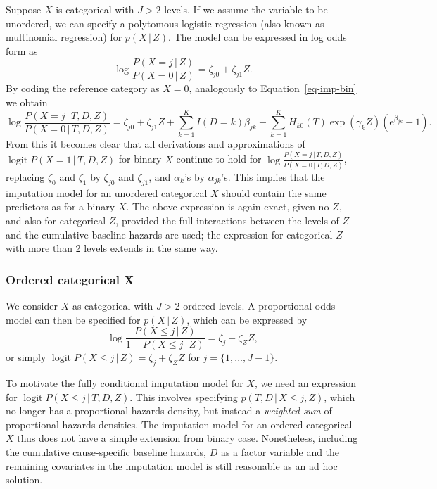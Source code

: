 \documentclass[
  letterpaper,
  DIV=11,
  numbers=noendperiod]{scrreprt}
\DeclareMathOperator{\logit}{logit}
\newcommand{\given}{\,|\,}
\begin{document}
Suppose \(X\) is categorical with \(J>2\) levels. If we assume the
variable to be unordered, we can specify a polytomous logistic
regression (also known as multinomial regression) for \(p(X \given Z)\).
The model can be expressed in log odds form as \begin{equation*}
    \log \frac{P(X = j \given Z)}{P(X = 0\given Z)}  = \zeta_{j0} + \zeta_{j1} Z.
\end{equation*} By coding the reference category as \(X=0\), analogously
to Equation~\ref{eq-imp-bin} we obtain \begin{equation*}
    \log \frac{P(X = j \given T,D,Z)}{P(X = 0\given T,D,Z)} = \zeta_{j0} + \zeta_{j1} Z + \sum^K_{k = 1} I(D=k) \beta_{jk} - \sum^K_{k = 1} H_{k0}(T)\exp(\gamma_k Z)(\mathrm{e}^{\beta_{jk}}  - 1).
\end{equation*} From this it becomes clear that all derivations and
approximations of \(\logit P(X = 1 \given T, D, Z)\) for binary \(X\)
continue to hold for
\(\log \frac{P(X = j \given T,D,Z)}{P(X = 0\given T,D,Z)}\), replacing
\(\zeta_0\) and \(\zeta_1\) by \(\zeta_{j0}\) and \(\zeta_{j1}\), and
\(\alpha_k\)'s by \(\alpha_{jk}\)'s. This implies that the imputation
model for an unordered categorical \(X\) should contain the same
predictors as for a binary \(X\). The above expression is again exact,
given no \(Z\), and also for categorical \(Z\), provided the full
interactions between the levels of \(Z\) and the cumulative baseline
hazards are used; the expression for categorical \(Z\) with more than 2
levels extends in the same way.

\subsubsection*{Ordered categorical X}\label{ordered-categorical-x-1}

We consider \(X\) as categorical with \(J>2\) ordered levels. A
proportional odds model can then be specified for \(p(X \given Z)\),
which can be expressed by \begin{equation*}
    \log \frac{P(X \leq j \given Z)}{1 - P(X \leq j \given Z)} = \zeta_{j} + \zeta_Z Z,
\end{equation*} or simply
\(\logit P(X \leq j \given Z) = \zeta_{j} + \zeta_Z Z\) for
\(j = \{1,...,J-1\}\).

To motivate the fully conditional imputation model for \(X\), we need an
expression for \(\logit P(X \leq j \given T,D,Z)\). This involves
specifying \(p(T, D \given X \leq j,Z)\), which no longer has a
proportional hazards density, but instead a \textit{weighted sum} of
proportional hazards densities. The imputation model for an ordered
categorical \(X\) thus does not have a simple extension from binary
case. Nonetheless, including the cumulative cause-specific baseline
hazards, \(D\) as a factor variable and the remaining covariates in the
imputation model is still reasonable as an ad hoc solution.
\end{document}
